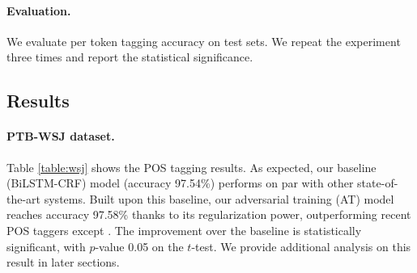 \documentclass[11pt,a4paper]{article}
\begin{document}
\paragraph{Evaluation.}
We evaluate 
per token tagging accuracy on test sets. 
We repeat the experiment three times and report the statistical significance.

\subsection{Results}
\paragraph{PTB-WSJ dataset.}

\begin{table}[!t]
\setlength{\extrarowheight}{1pt}
\centering
{}\vspace{-1mm}

\caption{POS tagging accuracy on the PTB-WSJ test set, with other top-performing systems.
}
\label{table:wsj}
\vspace{-4mm}
\end{table}

Table \ref{table:wsj} shows the POS tagging results.
As expected, our baseline (BiLSTM-CRF) model (accuracy 97.54\%) performs on par with other state-of-the-art systems.
Built upon this baseline, our adversarial training (AT) model reaches accuracy 97.58\% thanks to its regularization power, outperforming recent POS taggers except .
The improvement over the baseline is statistically significant, with $p$-value \scalebox{0.9}{$<$} 0.05 on the $t$-test.
We provide additional analysis on this result in later sections.
\end{document}
